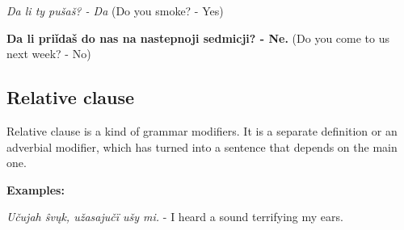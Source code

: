 \textit{Da li ty pušaš? - Da} (Do you smoke? - Yes)

\textbf{Da li priǐdaš do nas na nastepnoji sedmicji? - Ne.} (Do you come to us next week? - No)

\subsection{Relative clause}

Relative clause is a kind of grammar modifiers. It is a separate definition or an adverbial modifier, which has turned into a sentence that depends on the main one.

\textbf{Examples:}

\textit{Učujah ŝvųk, užasajučï ušy mi.} - I heard a sound terrifying my ears.